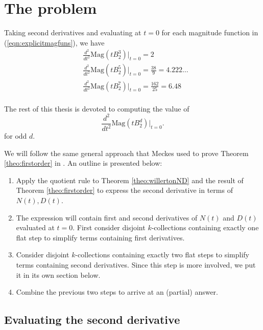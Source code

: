 \documentclass[11pt]{article}
\theoremstyle{mythm}
\begin{document}
\section{The problem}

Taking second derivatives and evaluating at $t = 0$ for each magnitude function in (\ref{eqn:explicitmagfuns}), we have
\begin{equation}\label{eqn:explicitseconds}
\begin{aligned}
&\frac{d^2}{dt^2}\text{Mag}(tB_2^3)\big\vert_{t=0} = 2 \\
&\frac{d^2}{dt^2}\text{Mag}(tB_2^5)\big\vert_{t=0} = \frac{38}{9} = 4.222\dots \\
&\frac{d^2}{dt^2}\text{Mag}(tB_2^7)\big\vert_{t=0} = \frac{162}{25} = 6.48 \\
\end{aligned}
\end{equation}

The rest of this thesis is devoted to computing the value of
\begin{equation*}
\frac{d^2}{dt^2}\text{Mag}(tB_2^d)\big\vert_{t=0}.
\end{equation*}
for odd $d$.

We will follow the same general approach that Meckes used to prove Theorem \ref{theo:firstorder} in \cite{meckes_magnitude_2019}. An outline is presented below:
\begin{enumerate}[label=\arabic*.]
\item Apply the quotient rule to Theorem \ref{theo:willertonND} and the result of Theorem \ref{theo:firstorder} to express the second derivative in terms of $N(t),D(t)$.
\item The expression will contain first and second derivatives of $N(t)$ and $D(t)$ evaluated at $t = 0$. First consider disjoint $k$-collections containing exactly one flat step to simplify terms containing first derivatives.
\item Consider disjoint $k$-collections containing exactly two flat steps to simplify terms containing second derivatives. Since this step is more involved, we put it in its own section below.
\item Combine the previous two steps to arrive at an (partial) answer.
\end{enumerate}

\subsection{Evaluating the second derivative}
\end{document}
